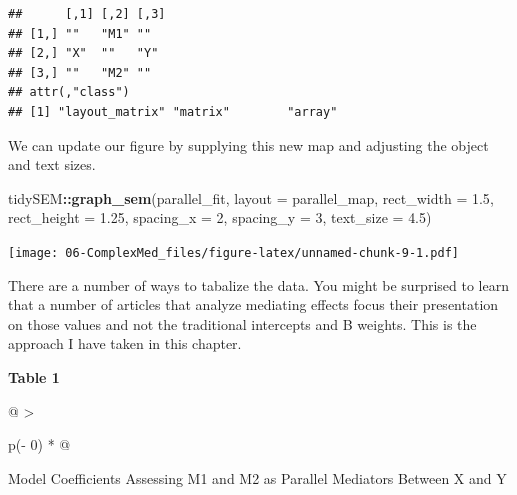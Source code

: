 \documentclass[
  11pt,
]{book}
\newenvironment{Shaded}{\begin{snugshade}}{\end{snugshade}}
\newcommand{\AttributeTok}[1]{\textcolor[rgb]{0.27,0.27,0.27}{#1}}
\newcommand{\DecValTok}[1]{\textcolor[rgb]{0.06,0.06,0.06}{#1}}
\newcommand{\FloatTok}[1]{\textcolor[rgb]{0.06,0.06,0.06}{#1}}
\newcommand{\FunctionTok}[1]{\textcolor[rgb]{0.27,0.27,0.27}{\textbf{#1}}}
\newcommand{\NormalTok}[1]{#1}
\newcommand{\SpecialCharTok}[1]{\textcolor[rgb]{0.43,0.43,0.43}{\textbf{#1}}}
\begin{document}
\begin{verbatim}
##      [,1] [,2] [,3]
## [1,] ""   "M1" ""  
## [2,] "X"  ""   "Y" 
## [3,] ""   "M2" ""  
## attr(,"class")
## [1] "layout_matrix" "matrix"        "array"
\end{verbatim}

We can update our figure by supplying this new map and adjusting the object and text sizes.

\begin{Shaded}
\begin{Highlighting}[]
\NormalTok{tidySEM}\SpecialCharTok{::}\FunctionTok{graph\_sem}\NormalTok{(parallel\_fit, }\AttributeTok{layout =}\NormalTok{ parallel\_map, }\AttributeTok{rect\_width =} \FloatTok{1.5}\NormalTok{,}
    \AttributeTok{rect\_height =} \FloatTok{1.25}\NormalTok{, }\AttributeTok{spacing\_x =} \DecValTok{2}\NormalTok{, }\AttributeTok{spacing\_y =} \DecValTok{3}\NormalTok{, }\AttributeTok{text\_size =} \FloatTok{4.5}\NormalTok{)}
\end{Highlighting}
\end{Shaded}

\texttt{[image: 06-ComplexMed\_files/figure-latex/unnamed-chunk-9-1.pdf]}

There are a number of ways to tabalize the data. You might be surprised to learn that a number of articles that analyze mediating effects focus their presentation on those values and not the traditional intercepts and B weights. This is the approach I have taken in this chapter.

\textbf{Table 1 }

\begin{longtable}[]{@{}
  >{\raggedright\arraybackslash}p{(\columnwidth - 0\tabcolsep) * }@{}}
\toprule\noalign{}
\begin{minipage}[b]{\linewidth}\raggedright
Model Coefficients Assessing M1 and M2 as Parallel Mediators Between X and Y
\end{minipage} \\
\midrule\noalign{}
\endhead
\bottomrule\noalign{}
\endlastfoot
\end{longtable}
\end{document}
